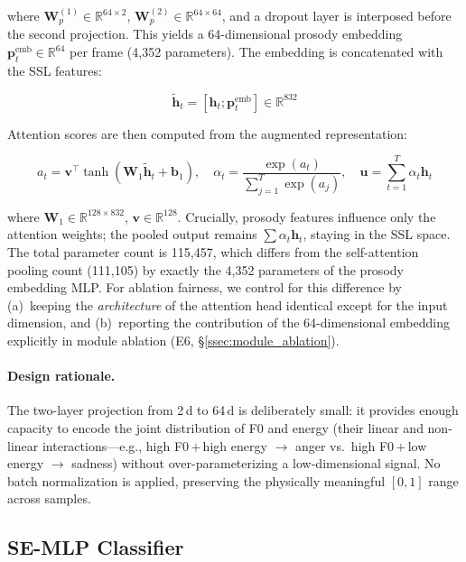 where $\mathbf{W}_p^{(1)} \in \mathbb{R}^{64 \times 2}$,
$\mathbf{W}_p^{(2)} \in \mathbb{R}^{64 \times 64}$,
and a dropout layer is interposed before the second projection. This yields a
64-dimensional prosody embedding $\mathbf{p}_t^{\text{emb}} \in \mathbb{R}^{64}$
per frame (4,352 parameters). The embedding is concatenated with the SSL features:

\begin{equation}
\tilde{\mathbf{h}}_t = [\mathbf{h}_t; \mathbf{p}_t^{\text{emb}}] \in \mathbb{R}^{832}
\end{equation}

Attention scores are then computed from the augmented representation:

\begin{equation}
a_t = \mathbf{v}^\top \tanh(\mathbf{W}_1 \tilde{\mathbf{h}}_t + \mathbf{b}_1), \quad
\alpha_t = \frac{\exp(a_t)}{\sum_{j=1}^{T} \exp(a_j)}, \quad
\mathbf{u} = \sum_{t=1}^{T} \alpha_t \mathbf{h}_t
\end{equation}

where $\mathbf{W}_1 \in \mathbb{R}^{128 \times 832}$, $\mathbf{v} \in \mathbb{R}^{128}$.
Crucially, prosody features influence only the attention weights; the pooled
output remains $\sum \alpha_t \mathbf{h}_t$, staying in the SSL space. The total
parameter count is 115,457, which differs from the self-attention pooling count
(111,105) by exactly the 4,352 parameters of the prosody embedding MLP. For
ablation fairness, we control for this difference by (a)~keeping the
\textit{architecture} of the attention head identical except for the input
dimension, and (b)~reporting the contribution of the 64-dimensional embedding
explicitly in module ablation (E6, \S\ref{ssec:module_ablation}).

\paragraph{Design rationale.} The two-layer projection from 2\,d to 64\,d is
deliberately small: it provides enough capacity to encode the joint
distribution of F0 and energy (their linear and non-linear interactions---e.g.,
high F0\,$+$\,high energy $\rightarrow$ anger vs.\ high F0\,$+$\,low energy
$\rightarrow$ sadness) without over-parameterizing a low-dimensional signal.
No batch normalization is applied, preserving the physically meaningful
$[0,1]$ range across samples.

\subsection{SE-MLP Classifier}
\label{ssec:classifier}

